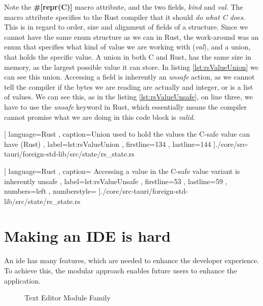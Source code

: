 Note the \textbf{\#[repr(C)]} macro attribute, and the two fields,
\textit{kind} and \textit{val}. The macro attribute specifies to the Rust
compiler that it should \textit{do what C does}. This is in regard to order,
size and alignment of fields of a structure. Since we cannot have the same enum
structure as we can in Rust, the work-around was an enum that specifies what
kind of value we are working with (\textit{val}), and a union, that holds the
specific value. A union in both C and Rust, has the same size in memory, as the
largest possible value it can store. In listing \ref{lst:rsValueUnion} we can
see this union. Accessing a field is inherently an \textit{unsafe} action, as we
cannot tell the compiler if the bytes we are reading are actually and integer,
or is a list of values. We can see this, as in the listing
\ref{lst:rsValueUnsafe}, on line three, we have to use the \textit{unsafe}
keyword in Rust, which essentially means the compiler cannot promise what we are
doing in this code block is \textit{valid}.

\begin{code}
  
    [ language=Rust
    , caption={Union used to hold the values the C-safe value can have (Rust)}
    , label=lst:rsValueUnion
    , firstline=134
    , lastline=144
    ]{./core/src-tauri/foreign-std-lib/src/state/rs\_state.rs}
\end{code}

\begin{code}
  
    [ language=Rust
    , caption={
      Accessing a value in the C-safe value variant is inherently unsafe
    }
    , label=lst:rsValueUnsafe
    , firstline=53
    , lastline=59
    , numbers=left
    , numberstyle=\tiny\color{gray}
    ]{./core/src-tauri/foreign-std-lib/src/state/rs\_state.rs}
\end{code}

\section{Making an IDE is hard}

An \gls{ide} has many features, which are needed to enhance the developer
experience. To achieve this, the modular approach enables future users to
enhance the application.

\begin{figure}
  \centering
  
  \caption{Text Editor Module Family}
  \label{fig:extendedModuleFamily}
\end{figure}

